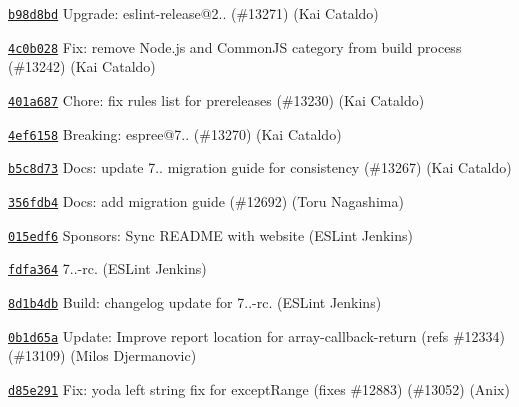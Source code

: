 \begin{DoxyItemize}
\item \href{https://github.com/eslint/eslint/commit/b98d8bda4630fe8278c5aa2b6650630770568fe5}{\texttt{ {\ttfamily b98d8bd}}} Upgrade\+: eslint-\/release@2.. (\#13271) (Kai Cataldo)
\item \href{https://github.com/eslint/eslint/commit/4c0b028c55fc1674b374efe0bc6dd22c02b4ac88}{\texttt{ {\ttfamily 4c0b028}}} Fix\+: remove Node.\+js and Common\+JS category from build process (\#13242) (Kai Cataldo)
\item \href{https://github.com/eslint/eslint/commit/401a68799d9d15145e1c7d92ee04644abec2f15a}{\texttt{ {\ttfamily 401a687}}} Chore\+: fix rules list for prereleases (\#13230) (Kai Cataldo)
\item \href{https://github.com/eslint/eslint/commit/4ef61580736353f700ab9e4e29f005b5ac552c78}{\texttt{ {\ttfamily 4ef6158}}} Breaking\+: espree@7.. (\#13270) (Kai Cataldo)
\item \href{https://github.com/eslint/eslint/commit/b5c8d7389bb2c5d4eae850b866832d099187818b}{\texttt{ {\ttfamily b5c8d73}}} Docs\+: update 7.. migration guide for consistency (\#13267) (Kai Cataldo)
\item \href{https://github.com/eslint/eslint/commit/356fdb46aa118ba3d81cee93e8c058a7c98acaf9}{\texttt{ {\ttfamily 356fdb4}}} Docs\+: add migration guide (\#12692) (Toru Nagashima)
\item \href{https://github.com/eslint/eslint/commit/015edf6467e33c67b904db037a674d71957a6865}{\texttt{ {\ttfamily 015edf6}}} Sponsors\+: Sync README with website (ESLint Jenkins)
\item \href{https://github.com/eslint/eslint/commit/fdfa364c1b0d88689d02cbe8ae848a3e323209aa}{\texttt{ {\ttfamily fdfa364}}} 7..-\/rc. (ESLint Jenkins)
\item \href{https://github.com/eslint/eslint/commit/8d1b4db9932cf7c3289187afbb3866a83f9b3f8c}{\texttt{ {\ttfamily 8d1b4db}}} Build\+: changelog update for 7..-\/rc. (ESLint Jenkins)
\item \href{https://github.com/eslint/eslint/commit/0b1d65a45aa5dfe08cd596c420490e81b546317e}{\texttt{ {\ttfamily 0b1d65a}}} Update\+: Improve report location for array-\/callback-\/return (refs \#12334) (\#13109) (Milos Djermanovic)
\item \href{https://github.com/eslint/eslint/commit/d85e291d1b56960373031f2562547df7285444f7}{\texttt{ {\ttfamily d85e291}}} Fix\+: yoda left string fix for except\+Range (fixes \#12883) (\#13052) (Anix)

\end{DoxyItemize}
